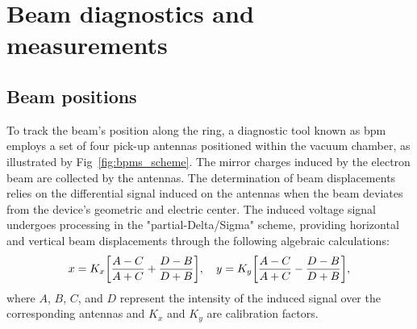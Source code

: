 


\section{Beam diagnostics and measurements}
\subsection{Beam positions}
To track the beam's position along the ring, a diagnostic tool known as \gls*{bpm} employs a set of four pick-up antennas positioned within the vacuum chamber, as illustrated by Fig~\ref{fig:bpms_scheme}. The mirror charges induced by the electron beam are collected by the antennas. The determination of beam displacements relies on the differential signal induced on the antennas when the beam deviates from the device's geometric and electric center. The induced voltage signal undergoes processing in the "partial-Delta/Sigma" scheme, providing horizontal and vertical beam displacements through the following algebraic calculations:
\begin{equation}
    x = K_x \qty[\frac{A-C}{A+C}+\frac{D - B}{D+B}], \quad y = K_y \qty[\frac{A-C}{A+C}-\frac{D - B}{D+B}],
\end{equation}
where $A$, $B$, $C$, and $D$ represent the intensity of the induced signal over the corresponding antennas and $K_x$ and $K_y$ are calibration factors.

